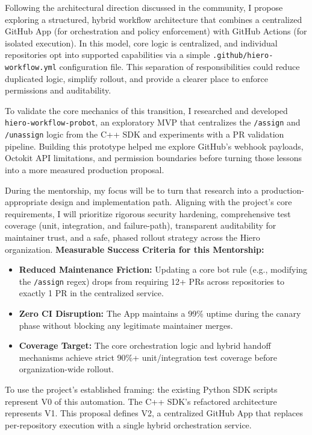 \documentclass[11pt]{article}
\begin{document}
Following the architectural direction discussed in the community, I propose exploring a structured, hybrid workflow architecture that combines a centralized GitHub App (for orchestration and policy enforcement) with GitHub Actions (for isolated execution). In this model, core logic is centralized, and individual repositories opt into supported capabilities via a simple \texttt{.github/hiero-workflow.yml} configuration file. This separation of responsibilities could reduce duplicated logic, simplify rollout, and provide a clearer place to enforce permissions and auditability.

To validate the core mechanics of this transition, I researched and developed \texttt{hiero-workflow-probot}, an exploratory MVP that centralizes the \texttt{/assign} and \texttt{/unassign} logic from the C++ SDK and experiments with a PR validation pipeline. Building this prototype helped me explore GitHub's webhook payloads, Octokit API limitations, and permission boundaries before turning those lessons into a more measured production proposal.

During the mentorship, my focus will be to turn that research into a production-appropriate design and implementation path. Aligning with the project's core requirements, I will prioritize rigorous security hardening, comprehensive test coverage (unit, integration, and failure-path), transparent auditability for maintainer trust, and a safe, phased rollout strategy across the Hiero organization.
\vspace{5pt}
\noindent\textbf{Measurable Success Criteria for this Mentorship:}
\begin{itemize}[leftmargin=18pt,itemsep=2pt,topsep=0pt]
    \item \textbf{Reduced Maintenance Friction:} Updating a core bot rule (e.g., modifying the \texttt{/assign} regex) drops from requiring 12+ PRs across repositories to exactly 1 PR in the centralized service.
    \item \textbf{Zero CI Disruption:} The App maintains a 99\% uptime during the canary phase without blocking any legitimate maintainer merges.
    \item \textbf{Coverage Target:} The core orchestration logic and hybrid handoff mechanisms achieve strict 90\%+ unit/integration test coverage before organization-wide rollout.
\end{itemize}

To use the project's established framing: the existing Python SDK scripts represent V0 of this automation. The C++ SDK's refactored architecture represents V1. This proposal defines V2, a centralized GitHub App that replaces per-repository execution with a single hybrid orchestration service.
\end{document}
